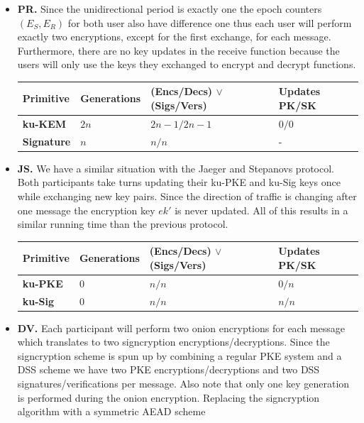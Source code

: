 \documentclass[11pt,a4paper,twoside,openright,bibliography=totoc]{scrbook}
\begin{document}
\begin{itemize}
\item \textbf{PR.} Since the unidirectional period is exactly one
  the epoch counters $(E_S,E_R)$ for both user also have difference one
  thus each user will perform exactly two encryptions, except for the
  first exchange, for each message.
  Furthermore, there are no key updates in the receive function because
  the users will only use the keys they exchanged to encrypt and decrypt
  functions.
  \begin{center}
    \begin{tabular}{ | l | l | l | l |}
    \hline
    Primitive & Generations & (Encs/Decs) $\vee$ (Sigs/Vers) & Updates PK/SK \\ \hline
    \textbf{ku-KEM} & $2n$ & $2n-1/2n-1$ & $0/0$ \\ \hline
    \textbf{Signature} & $n$ & $n/n$ & - \\  
    \hline
    \end{tabular}
  \end{center}
\item \textbf{JS.} We have a similar situation with the Jaeger and Stepanovs
  protocol. Both participants take turns updating their ku-PKE and
  ku-Sig keys once while exchanging new key pairs. Since the direction
  of traffic is changing after one message the encryption key $ek'$
  is never updated. All of this results in a similar running time
  than the previous protocol.
  \begin{center}
    \begin{tabular}{ | l | l | l | l |}
    \hline
    Primitive & Generations & (Encs/Decs) $\vee$ (Sigs/Vers) & Updates PK/SK \\ \hline
    \textbf{ku-PKE} & $0$ & $n/n$ & $0/n$ \\ \hline
    \textbf{ku-Sig} & $0$ & $n/n$ & $n/n$ \\  
    \hline
    \end{tabular}
  \end{center}
\item \textbf{DV.} Each participant will perform two onion encryptions
  for each message which translates to two signcryption
  encryptions/decryptions. Since the signcryption scheme is spun up by combining
  a regular PKE system and a DSS scheme we have two PKE encryptions/decryptions
  and two DSS signatures/verifications per message. Also note that
  only one key generation is performed during the onion encryption.
  Replacing the signcryption algorithm with a symmetric AEAD scheme

\end{itemize}
\end{document}
